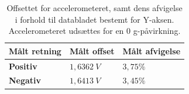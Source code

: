 \begin{table}[H]
	\centering
	\begin{tabular}{|l|l|l|}
	\textbf{Målt retning} & \textbf{Målt offset} & \textbf{Målt afvigelse} \\ \hline
    \textbf{Positiv} 			& $1,6362~V$	& $3,75 \%$    \\ \hline
    \textbf{Negativ} 			& $1,6413~V$	& $3,45 \%$	\\ \hline
	\end{tabular}
	\caption{Offsettet for accelerometeret, samt dens afvigelse i forhold til databladet bestemt for Y-aksen. Accelerometeret udsættes for en 0 g-påvirkning.}
	\label{tab:acc_offset}
\end{table}

